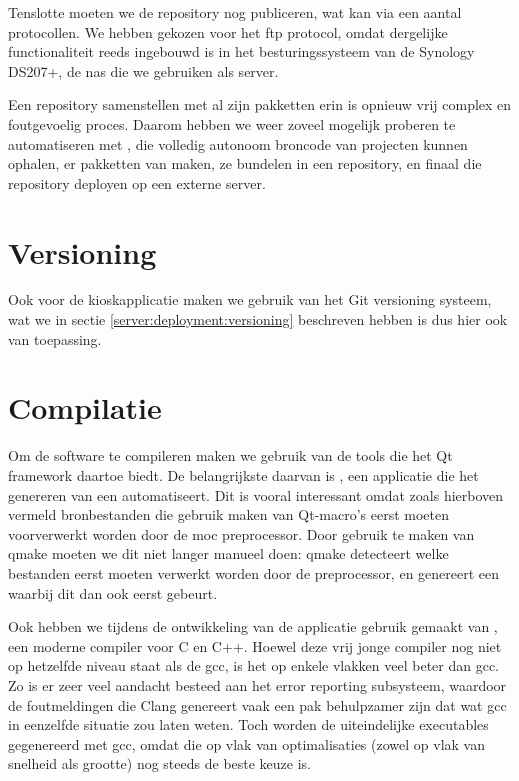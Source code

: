 Tenslotte moeten we de repository nog publiceren, wat kan via een aantal protocollen. We hebben gekozen voor het \ac{ftp} protocol, omdat dergelijke functionaliteit reeds ingebouwd is in het besturingssysteem van de Synology DS207+, de \ac{nas} die we gebruiken als server.

Een repository samenstellen met al zijn pakketten erin is opnieuw vrij complex en foutgevoelig proces. Daarom hebben we weer zoveel mogelijk proberen te automatiseren met , die volledig autonoom broncode van projecten kunnen ophalen, er pakketten van maken, ze bundelen in een repository, en finaal die repository deployen op een externe server.

\section{Versioning}
\label{kiosk:deployment:versioning}

Ook voor de kioskapplicatie maken we gebruik van het Git versioning systeem, wat we in sectie \ref{server:deployment:versioning} beschreven hebben is dus hier ook van toepassing.

\section{Compilatie}
\label{kiosk:deployment:compilatie}

Om de software te compileren maken we gebruik van de tools die het Qt framework daartoe biedt. De belangrijkste daarvan is , een applicatie die het genereren van een  automatiseert. Dit is vooral interessant omdat zoals hierboven vermeld bronbestanden die gebruik maken van Qt-macro's eerst moeten voorverwerkt worden door de \ac{moc} preprocessor. Door gebruik te maken van qmake moeten we dit niet langer manueel doen: qmake detecteert welke bestanden eerst moeten verwerkt worden door de preprocessor, en genereert een  waarbij dit dan ook eerst gebeurt.

Ook hebben we tijdens de ontwikkeling van de applicatie gebruik gemaakt van , een moderne compiler voor C en C++. Hoewel deze vrij jonge compiler nog niet op hetzelfde niveau staat als de \ac{gcc}, is het op enkele vlakken veel beter dan \ac{gcc}. Zo is er zeer veel aandacht besteed aan het error reporting subsysteem, waardoor de foutmeldingen die Clang genereert vaak een pak behulpzamer zijn dat wat \ac{gcc} in eenzelfde situatie zou laten weten. Toch worden de uiteindelijke executables gegenereerd met \ac{gcc}, omdat die op vlak van optimalisaties (zowel op vlak van snelheid als grootte) nog steeds de beste keuze is.

